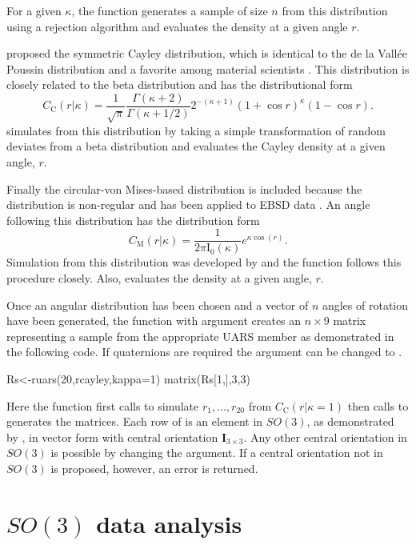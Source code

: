 For a given $\kappa$, the function  generates a sample of size $n$ from this distribution using a rejection algorithm and  evaluates the density at a given angle $r$.

\citet{leon2006} proposed the symmetric Cayley distribution, which is identical to the de la Vall\'{e}e Poussin distribution and a favorite among material scientists \citep{Schaeben1997}.  This distribution is closely related to the beta distribution and has the distributional form
\[
C_\mathrm{C}(r |\kappa)=\frac{1}{\sqrt{\pi}} \frac{\Gamma(\kappa+2)}{\Gamma(\kappa+1/2)}2^{-(\kappa+1)}(1+\cos r)^\kappa(1-\cos r).
\]
 simulates from this distribution by taking a simple transformation of random deviates from a beta distribution and  evaluates the Cayley density at a given angle, $r$.

Finally the circular-von Mises-based distribution is included because the distribution is non-regular and has been applied to EBSD data \citep{bingham2009}.  An angle following this distribution has the distribution form
\[
C_\mathrm{M}(r|\kappa)=\frac{1}{2\pi \mathrm{I_0}(\kappa)}e^{\kappa\cos(r)}.
\]
Simulation from this distribution was developed by \citet{best1979} and the function  follows this procedure closely.  Also,  evaluates the density at a given angle, $r$.

Once an angular distribution has been chosen and a vector of $n$ angles of rotation have been generated, the  function with argument  creates an $n\times 9$ matrix representing a sample from the appropriate UARS member as demonstrated in the following code.  If quaternions are required the argument  can be changed to .

\begin{example}
Rs<-ruars(20,rcayley,kappa=1)
matrix(Rs[1,],3,3)
\end{example}

Here the  function first calls  to simulate $r_1,\ldots,r_{20}$ from  $C_\mathrm{C}(r |\kappa=1)$ then calls  to generates the matrices.  Each row of  is an element in $SO(3)$, as demonstrated by , in vector form with central orientation $\bm I_{3\times 3}$.  Any other central orientation in $SO(3)$ is possible by changing the  argument.  If a central orientation not in $SO(3)$ is proposed, however, an error is returned.

\section{$SO(3)$ data analysis\label{section:analysis}}

